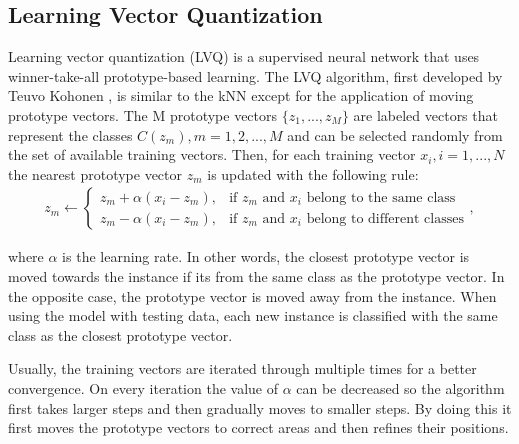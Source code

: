 \subsection{Learning Vector Quantization}
Learning vector quantization (LVQ) is a supervised neural network that uses winner-take-all prototype-based learning. The LVQ algorithm, first developed by Teuvo Kohonen \cite{Kohonen90}, is similar to the kNN except for the application of moving prototype vectors. The M prototype vectors $\{z_1, ..., z_M\}$ are labeled vectors that represent the classes $C(z_m), m = 1, 2, ..., M$ and can be selected randomly from the set of available training vectors. Then, for each training vector $x_i, i = 1, ..., N$ the nearest prototype vector $z_m$ is updated with the following rule:
\begin{align}
z_m \leftarrow 
\begin{cases}
z_m + \alpha (x_i - z_m), & \text{if $z_m$ and $x_i$ belong to the same class} \\
z_m - \alpha (x_i - z_m), & \text{if $z_m$ and $x_i$ belong to different classes}
\end{cases},
\end{align} 

where $\alpha$ is the learning rate. In other words, the closest prototype vector is moved towards the instance if its from the same class as the prototype vector. In the opposite case, the prototype vector is moved away from the instance. When using the model with testing data, each new instance is classified with the same class as the closest prototype vector.

Usually, the training vectors are iterated through multiple times for a better convergence. On every iteration the value of $\alpha$ can be decreased so the algorithm first takes larger steps and then gradually moves to smaller steps. By doing this it first moves the prototype vectors to correct areas and then refines their positions. \cite{Li08}

